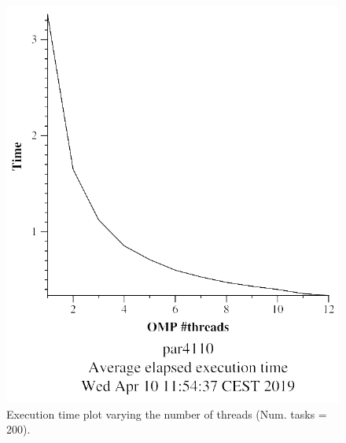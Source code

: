 \documentclass[12pt, a4paper]{article}
\begin{document}
\begin{figure}[H]
\centering
\begin{minipage}[b]{0.4\linewidth}
  \centering
  \includegraphics[scale=0.5]{./mandel-omp-10000-strong-omp-3-200-time}
  \caption{Execution time plot varying the number of threads (Num. tasks = 200).}
  \label{fig:mandel-omp-10000-strong-omp-3-200-time}
\end{minipage}%
\hspace{0.5cm}
\begin{minipage}[b]{0.4\linewidth}
  \centering

\end{minipage}
\end{figure}
\end{document}
